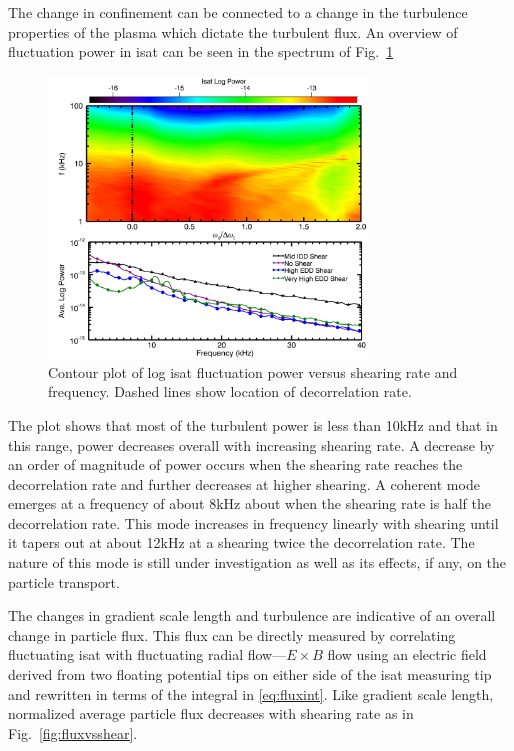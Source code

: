 \documentclass[%
 aps,
 prl,
 amsmath,amssymb,
 reprint,%
]{revtex4-1}
\begin{document}
The change in confinement can be connected to a change in the turbulence properties of the plasma which dictate the turbulent flux. An overview of fluctuation power in isat can be seen in the spectrum of Fig.~\ref{fig:powercontour}
\begin{figure}
\begin{center}
\includegraphics[width=8.5cm]{powercontour.pdf}%
\caption{\label{fig:powercontour} Contour plot of log isat fluctuation power versus shearing rate and frequency. Dashed lines show location of decorrelation rate.}
\end{center}
\end{figure}
The plot shows that most of the turbulent power is less than 10kHz and that in this range, power decreases overall with increasing shearing rate. A decrease by an order of magnitude of power occurs when the shearing rate reaches the decorrelation rate and further decreases at higher shearing. A coherent mode emerges at a frequency of about 8kHz about when the shearing rate is half the decorrelation rate. This mode increases in frequency linearly with shearing until it tapers out at about 12kHz at a shearing twice the decorrelation rate. The nature of this mode is still under investigation as well as its effects, if any, on the particle transport. 

The changes in gradient scale length and turbulence are indicative of an overall change in particle flux. This flux can be directly measured by correlating fluctuating isat with fluctuating radial flow---$E \times B$ flow using an electric field derived from two floating potential tips on either side of the isat measuring tip and rewritten in terms of the integral in \eqref{eq:fluxint}. Like gradient scale length, normalized average particle flux decreases with shearing rate as in Fig.~\ref{fig:fluxvsshear}.
\end{document}
